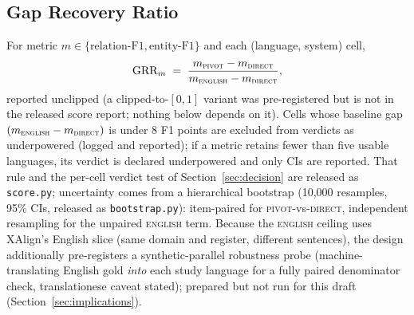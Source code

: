 \documentclass{llncs}
\begin{document}
\subsection{Gap Recovery Ratio}\label{sec:grr}
For metric $m \in \{\text{relation-F1}, \text{entity-F1}\}$ and each
(language, system) cell,
\[
\mathrm{GRR}_m \;=\; \frac{m_{\textsc{pivot}} - m_{\textsc{direct}}}
                          {m_{\textsc{english}} - m_{\textsc{direct}}},
\]
reported unclipped (a clipped-to-$[0,1]$ variant was pre-registered but is
not in the released score report; nothing below depends on it). Cells whose
baseline gap $(m_{\textsc{english}} - m_{\textsc{direct}})$ is under 8 F1
points are excluded from verdicts as underpowered (logged and reported); if
a metric retains fewer than five usable languages, its verdict is declared
underpowered and only CIs are reported. That rule and the per-cell verdict
test of Section~\ref{sec:decision} are released as \texttt{score.py};
uncertainty comes from
a hierarchical bootstrap (10{,}000 resamples, 95\% CIs, released
as \texttt{bootstrap.py}): item-paired for \textsc{pivot}-vs-\textsc{direct},
independent resampling for the unpaired \textsc{english} term. Because the
\textsc{english} ceiling uses XAlign's English slice (same domain and
register, different sentences), the design additionally pre-registers a
synthetic-parallel robustness probe (machine-translating English gold
\emph{into} each study language for a fully paired denominator check,
translationese caveat stated); prepared but not run for this draft
(Section~\ref{sec:implications}).
\end{document}
